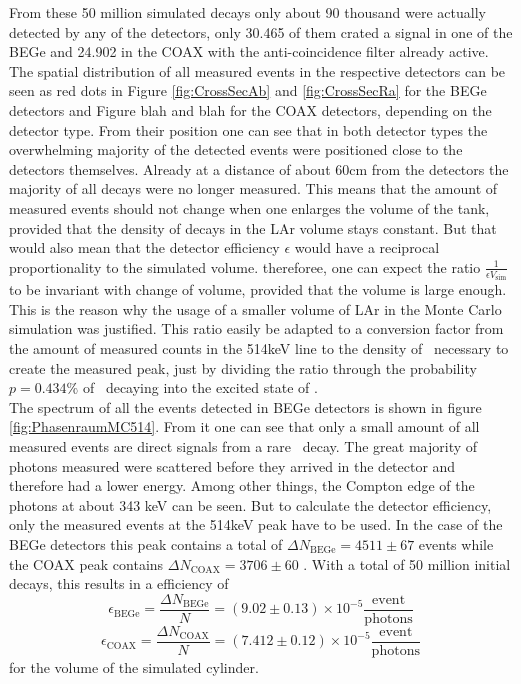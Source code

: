 \documentclass[encoding=utf8,british]{tumphthesis}
\begin{document}
From these 50 million simulated decays only about 90 thousand were actually detected by any of the detectors, only 30.465 of them crated a signal in one of the BEGe and 24.902 in the COAX with the anti-coincidence filter already active.
The spatial distribution of all measured events in the respective detectors can be seen as red dots in Figure \ref{fig:CrossSecAb} and \ref{fig:CrossSecRa} for the BEGe detectors and Figure blah and blah for the COAX detectors, depending on the detector type.
From their position one can see that in both detector types the overwhelming majority of the detected events were positioned close to the detectors themselves.
Already at a distance of about 60cm from the detectors the majority of all decays were no longer measured.
This means that the amount of measured events should not change when one enlarges the volume of the tank, provided that the density of decays in the LAr volume stays constant.
But that would also mean that the detector efficiency $\epsilon$ would have a reciprocal proportionality to the simulated volume.
thereforee, one can expect the ratio $\frac{1}{\epsilon V_{\mathrm{sim}}}$ to be invariant with change of volume, provided that the volume is large enough.   
This is the reason why the usage of a smaller volume of LAr in the Monte Carlo simulation was justified.
This ratio easily be adapted to a conversion factor from the amount of measured counts in the 514keV line to the density of \Kr\ necessary to create the measured peak, just by dividing the ratio through the probability $p = 0.434\%$ of \Kr\ decaying into the excited state of .
\\

The spectrum of all the events detected in BEGe detectors is shown in figure \ref{fig:PhasenraumMC514}.
From it one can see that only a small amount of all measured events are direct signals from a rare \Kr\ decay. 
The great majority of photons measured were scattered before they arrived in the detector and therefore had a lower energy.
Among other things, the Compton edge of the photons at about 343 keV can be seen.
But to calculate the detector efficiency, only the measured events at the 514keV peak have to be used.
In the case of the BEGe detectors this peak contains a total of \(\Delta N_{\mathrm{BEGe}} = 4511\pm67\) events while the COAX peak contains  \(\Delta N_{\mathrm{COAX}} = 3706\pm60\) .
With a total of 50 million initial decays, this results in a efficiency of 
\begin{equation*}
\epsilon_{\mathrm{BEGe}} = \frac{\Delta N_{\mathrm{BEGe}}}{N} = (9.02\pm0.13) \times 10^{-5}  \frac{\mathrm{event}}{\mathrm{photons}}
\end{equation*}
\begin{equation*}
\epsilon_{\mathrm{COAX}} = \frac{\Delta N_{\mathrm{COAX}}}{N} = (7.412\pm0.12) \times 10^{-5}  \frac{\mathrm{event}}{\mathrm{photons}}
\end{equation*}
for the volume of the simulated cylinder.
\\
\end{document}
